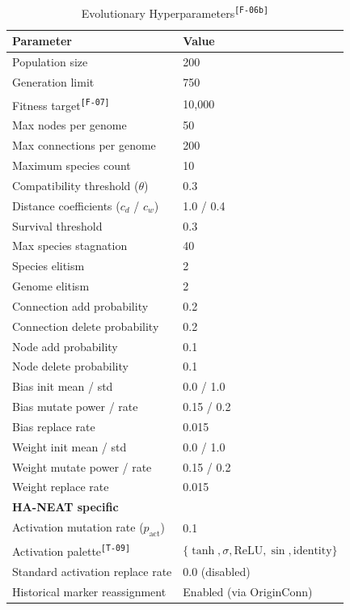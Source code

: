 \documentclass[12pt]{article}
\newcommand{\revID}[1]{\textsuperscript{\scriptsize\texttt{[#1]}}}
\newcommand{\revTerm}[2]{\textcolor{lrTeal}{#2}\revID{#1}}      %
\newcommand{\revFig}[2]{\textcolor{lrAmber}{#2}\revID{#1}}      %
\begin{document}
\begin{table}[h]
\centering
\caption{\revFig{F-06b}{Evolutionary Hyperparameters}}
\label{tab:hyperparameters}
\begin{tabular}{ll}
\toprule
\textbf{Parameter} & \textbf{Value} \\
\midrule
Population size & 200 \\
Generation limit & 750 \\
\revFig{F-07}{Fitness target} & 10{,}000 \\
Max nodes per genome & 50 \\
Max connections per genome & 200 \\
Maximum species count & 10 \\
Compatibility threshold ($\theta$) & 0.3 \\
Distance coefficients ($c_d$ / $c_w$) & 1.0 / 0.4 \\
Survival threshold & 0.3 \\
Max species stagnation & 40 \\
Species elitism & 2 \\
Genome elitism & 2 \\
Connection add probability & 0.2 \\
Connection delete probability & 0.2 \\
Node add probability & 0.1 \\
Node delete probability & 0.1 \\
Bias init mean / std & 0.0 / 1.0 \\
Bias mutate power / rate & 0.15 / 0.2 \\
Bias replace rate & 0.015 \\
Weight init mean / std & 0.0 / 1.0 \\
Weight mutate power / rate & 0.15 / 0.2 \\
Weight replace rate & 0.015 \\
\midrule
\textbf{HA-NEAT specific} & \\
Activation mutation rate ($p_{\text{act}}$) & 0.1 \\
\revTerm{T-09}{Activation palette} & $\{\tanh, \sigma, \text{ReLU}, \sin, \text{identity}\}$ \\
Standard activation replace rate & 0.0 (disabled) \\
Historical marker reassignment & Enabled (via OriginConn) \\
\bottomrule
\end{tabular}
\end{table}
\end{document}
